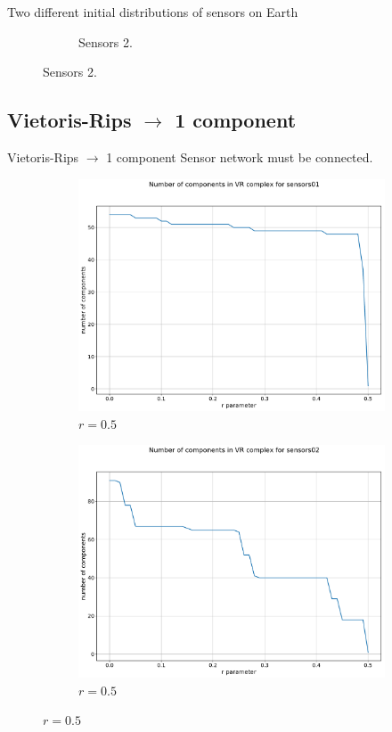 \documentclass{beamer}
\begin{document}
\begin{frame}{Two different initial distributions of sensors on Earth}
\begin{figure}[!ht]
\begin{subfigure}{.5\textwidth}
		\caption{Sensors 2.}
	\end{subfigure}%
	
\end{figure}
\end{frame}

\subsection{Vietoris-Rips $\longrightarrow$ 1 component}

\begin{frame}{Vietoris-Rips $\longrightarrow$ 1 component}
Sensor network must be connected.
\begin{figure}[!ht]
	\centering
	\begin{subfigure}{.5\textwidth}
		\centering
		\includegraphics[scale=0.19]{used_images/plot_vr_sensors01.pdf}
		\caption{$r = 0.5$}
	\end{subfigure}%
	\begin{subfigure}{.5\textwidth}
		\centering
		\includegraphics[scale=0.19]{used_images/plot_vr_sensors02.pdf}
		\caption{$r = 0.5$}
	\end{subfigure}%
	
\end{figure}
\end{frame}
\end{document}
